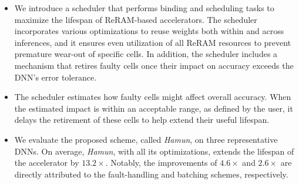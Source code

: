 \begin{itemize}

\item We introduce a scheduler that performs binding and scheduling tasks to maximize the lifespan of ReRAM-based accelerators. The scheduler incorporates various optimizations to reuse weights both within and across inferences, and it ensures even utilization of all ReRAM resources to prevent premature wear-out of specific cells. In addition, the scheduler includes a mechanism that retires faulty cells once their impact on accuracy exceeds the DNN’s error tolerance.


\item The scheduler estimates how faulty cells might affect overall accuracy. When the estimated impact is within an acceptable range, as defined by the user, it delays the retirement of these cells to help extend their useful lifespan.

\item We evaluate the proposed scheme, called \textit{Hamun}, on three representative DNNs. On average, \textit{Hamun}, with all its optimizations, extends the lifespan of the accelerator by $13.2\times$. Notably, the improvements of $4.6\times$ and $2.6\times$ are directly attributed to the fault-handling and batching schemes, respectively.

\end{itemize}


